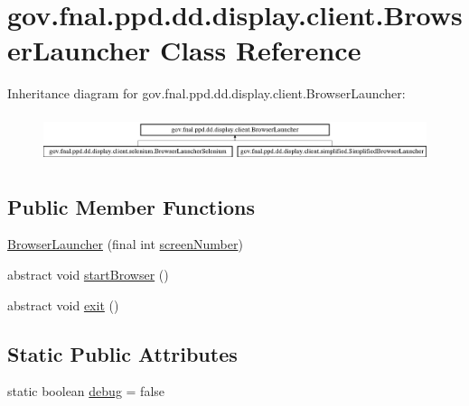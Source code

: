\hypertarget{classgov_1_1fnal_1_1ppd_1_1dd_1_1display_1_1client_1_1BrowserLauncher}{\section{gov.\-fnal.\-ppd.\-dd.\-display.\-client.\-Browser\-Launcher Class Reference}
\label{classgov_1_1fnal_1_1ppd_1_1dd_1_1display_1_1client_1_1BrowserLauncher}
}
Inheritance diagram for gov.\-fnal.\-ppd.\-dd.\-display.\-client.\-Browser\-Launcher\-:\begin{figure}[H]
\begin{center}
\leavevmode
\includegraphics[height=1.393035cm]{classgov_1_1fnal_1_1ppd_1_1dd_1_1display_1_1client_1_1BrowserLauncher}
\end{center}
\end{figure}
\subsection*{Public Member Functions}
\begin{DoxyCompactItemize}
\item 
\hyperlink{classgov_1_1fnal_1_1ppd_1_1dd_1_1display_1_1client_1_1BrowserLauncher_aca76d8caee5d9de33b80e3397292ca25}{Browser\-Launcher} (final int \hyperlink{classgov_1_1fnal_1_1ppd_1_1dd_1_1display_1_1client_1_1BrowserLauncher_aa30aa801b0b7b60138f39610c4e2f211}{screen\-Number})
\item 
abstract void \hyperlink{classgov_1_1fnal_1_1ppd_1_1dd_1_1display_1_1client_1_1BrowserLauncher_a09da69929d79dc20075d5be2572f361c}{start\-Browser} ()
\item 
abstract void \hyperlink{classgov_1_1fnal_1_1ppd_1_1dd_1_1display_1_1client_1_1BrowserLauncher_adce8df8835d3d00a6cbad7f7c8189820}{exit} ()
\end{DoxyCompactItemize}
\subsection*{Static Public Attributes}
\begin{DoxyCompactItemize}
\item 
static boolean \hyperlink{classgov_1_1fnal_1_1ppd_1_1dd_1_1display_1_1client_1_1BrowserLauncher_a1e0101712e66f938f905b9b17baf101d}{debug} = false
\end{DoxyCompactItemize}
